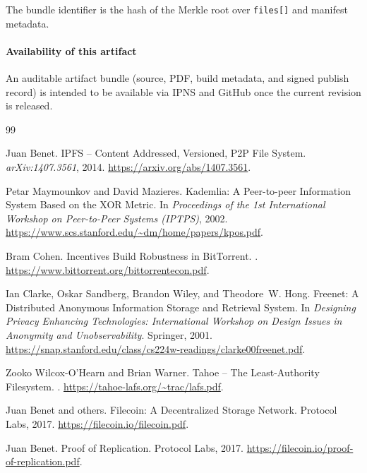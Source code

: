 \documentclass[11pt]{article}
\begin{document}
The bundle identifier is the hash of the Merkle root over \texttt{files[]} and manifest metadata.

\paragraph{Availability of this artifact}
An auditable artifact bundle (source, PDF, build metadata, and signed publish
record) is intended to be available via IPNS and GitHub once the current revision is released.

\begin{thebibliography}{99}

Juan Benet.
\newblock IPFS -- Content Addressed, Versioned, {P2P} File System.
\newblock \emph{arXiv:1407.3561}, 2014.
\newblock \url{https://arxiv.org/abs/1407.3561}.

Petar Maymounkov and David Mazieres.
\newblock Kademlia: A Peer-to-peer Information System Based on the XOR Metric.
\newblock In \emph{Proceedings of the 1st International Workshop on
  Peer-to-Peer Systems (IPTPS)}, 2002.
\newblock \url{https://www.scs.stanford.edu/~dm/home/papers/kpos.pdf}.

Bram Cohen.
\newblock Incentives Build Robustness in {BitTorrent}.
.
\newblock \url{https://www.bittorrent.org/bittorrentecon.pdf}.

Ian Clarke, Oskar Sandberg, Brandon Wiley, and Theodore~W. Hong.
\newblock Freenet: A Distributed Anonymous Information Storage and Retrieval
  System.
\newblock In \emph{Designing Privacy Enhancing Technologies: International
  Workshop on Design Issues in Anonymity and Unobservability}. Springer, 2001.
\newblock \url{https://snap.stanford.edu/class/cs224w-readings/clarke00freenet.pdf}.

Zooko Wilcox-O'Hearn and Brian Warner.
\newblock Tahoe -- The Least-Authority Filesystem.
.
\newblock \url{https://tahoe-lafs.org/~trac/lafs.pdf}.

Juan Benet and others.
\newblock Filecoin: A Decentralized Storage Network.
\newblock Protocol Labs, 2017.
\newblock \url{https://filecoin.io/filecoin.pdf}.

Juan Benet.
\newblock Proof of Replication.
\newblock Protocol Labs, 2017.
\newblock \url{https://filecoin.io/proof-of-replication.pdf}.


\end{thebibliography}
\end{document}
